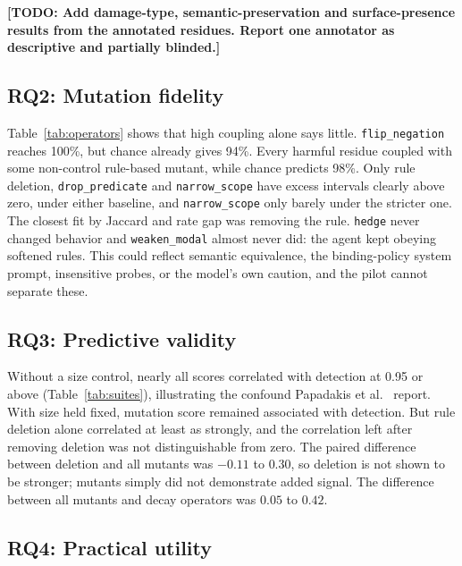\documentclass[manuscript,screen,nonacm]{acmart}
\newcommand{\todo}[1]{\textbf{[TODO: #1]}}
\begin{document}
\todo{Add damage-type, semantic-preservation and surface-presence results from the annotated residues. Report one annotator as descriptive and partially blinded.}

\subsection{RQ2: Mutation fidelity}

Table~\ref{tab:operators} shows that high coupling alone says little. \texttt{flip\_negation} reaches 100\%, but chance already gives 94\%. Every harmful residue coupled with some non-control rule-based mutant, while chance predicts 98\%. Only rule deletion, \texttt{drop\_predicate} and \texttt{narrow\_scope} have excess intervals clearly above zero, under either baseline, and \texttt{narrow\_scope} only barely under the stricter one. The closest fit by Jaccard and rate gap was removing the rule. \texttt{hedge} never changed behavior and \texttt{weaken\_modal} almost never did: the agent kept obeying softened rules. This could reflect semantic equivalence, the binding-policy system prompt, insensitive probes, or the model's own caution, and the pilot cannot separate these.



\subsection{RQ3: Predictive validity}

Without a size control, nearly all scores correlated with detection at 0.95 or above (Table~\ref{tab:suites}), illustrating the confound Papadakis et al.~\cite{papadakis2018} report. With size held fixed, mutation score remained associated with detection. But rule deletion alone correlated at least as strongly, and the correlation left after removing deletion was not distinguishable from zero. The paired difference between deletion and all mutants was $-0.11$ to $0.30$, so deletion is not shown to be stronger; mutants simply did not demonstrate added signal. The difference between all mutants and decay operators was $0.05$ to $0.42$.



\subsection{RQ4: Practical utility}
\end{document}
